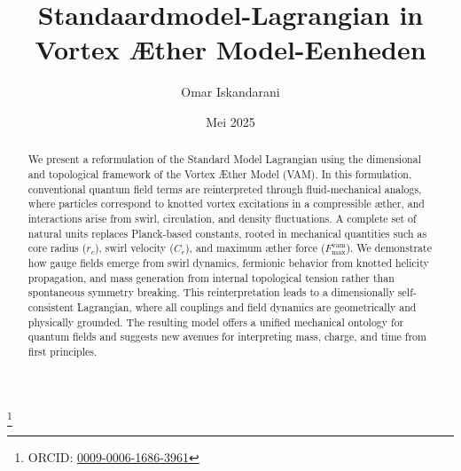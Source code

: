 \documentclass[a4paper, aps,preprint,superscriptaddress, 12pt]{revtex4}
\begin{document}
\author{Omar Iskandarani}
\title{Standaardmodel-Lagrangian in Vortex Æther Model-Eenheden}
\date{Mei 2025}
\thanks{ORCID: \href{https://orcid.org/0009-0006-1686-3961}{0009-0006-1686-3961}}

\begin{abstract}
We present a reformulation of the Standard Model Lagrangian using the dimensional and topological framework of the Vortex Æther Model (VAM). In this formulation, conventional quantum field terms are reinterpreted through fluid-mechanical analogs, where particles correspond to knotted vortex excitations in a compressible æther, and interactions arise from swirl, circulation, and density fluctuations. A complete set of natural units replaces Planck-based constants, rooted in mechanical quantities such as core radius (\(r_c\)), swirl velocity (\(C_e\)), and maximum æther force (\(F^\text{vam}_\text{max}\)). We demonstrate how gauge fields emerge from swirl dynamics, fermionic behavior from knotted helicity propagation, and mass generation from internal topological tension rather than spontaneous symmetry breaking. This reinterpretation leads to a dimensionally self-consistent Lagrangian, where all couplings and field dynamics are geometrically and physically grounded. The resulting model offers a unified mechanical ontology for quantum fields and suggests new avenues for interpreting mass, charge, and time from first principles.
\end{abstract}

    \maketitle

    
    
    
    
    
    
    
    
    
    
    
    

    
    
\end{document}
